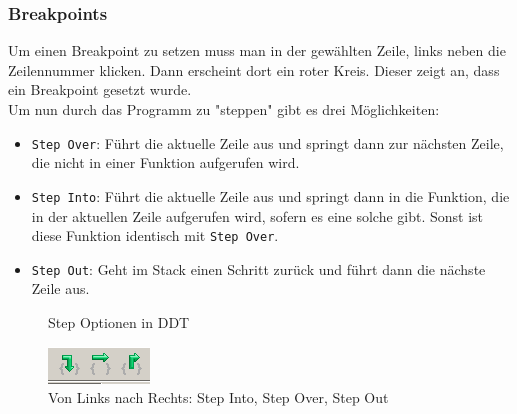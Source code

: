 \documentclass[12pt]{article}
\begin{document}
\begin{sloppypar}
\subsubsection*{Breakpoints}
Um einen Breakpoint zu setzen muss man in der gewählten Zeile, links neben die Zeilennummer klicken. Dann erscheint dort ein roter Kreis. Dieser zeigt an, dass ein Breakpoint gesetzt wurde. \\
Um nun durch das Programm zu "steppen" gibt es drei Möglichkeiten:
\begin{itemize}
    \item \verb|Step Over|: Führt die aktuelle Zeile aus und springt dann zur nächsten Zeile, die nicht in einer Funktion aufgerufen wird.
    \item \verb|Step Into|: Führt die aktuelle Zeile aus und springt dann in die Funktion, die in der aktuellen Zeile aufgerufen wird, sofern es eine solche gibt. Sonst ist diese Funktion identisch mit \verb|Step Over|.
    \item \verb|Step Out|: Geht im Stack einen Schritt zurück und führt dann die nächste Zeile aus. 
\end{itemize}

\begin{figure}[htbp]
    \centering
    \caption{Step Optionen in DDT}
    \begin{minipage}[t]{0.8\textwidth}
        \includegraphics[width=\textwidth]{res/ddt-steps.PNG}
        \caption*{Von Links nach Rechts: Step Into, Step Over, Step Out}
    \end{minipage}
\end{figure}



\end{sloppypar}
\end{document}
